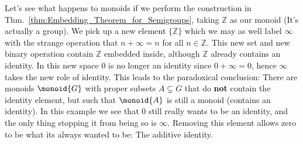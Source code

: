         Let's see what happens to monoids if we perform the construction in
        Thm.~\ref{thm:Embedding_Theorem_for_Semigroups}, taking $\mathbb{Z}$ as
        our monoid (It's actually a group). We pick up a new element
        $\{\mathbb{Z}\}$ which we may as well label $\infty$ with the strange
        operation that $n+\infty=n$ for all $n\in\mathbb{Z}$. This new set and
        new binary operation contain $\mathbb{Z}$ embedded inside, although
        $\mathbb{Z}$ already contains an identity. In this new space 0 is no
        longer an identity since $0+\infty=0$, hence $\infty$ takes the new role
        of identity. This leads to the paradoxical conclusion: There are monoids
        $\monoid{G}$ with proper subsets $A\subsetneq{G}$ that do \textbf{not}
        contain the identity element, but such that $\monoid{A}$ is still a
        monoid (contains an identity). In this example we see that 0 still
        really wants to be an identity, and the only thing stopping it from
        being so is $\infty$. Removing this element allows zero to be what its
        always wanted to be: The additive identity.
